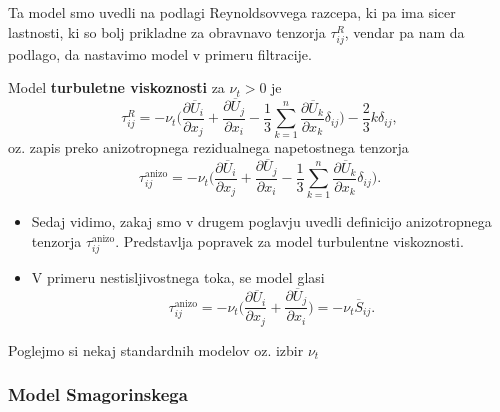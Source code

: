\documentclass[mat2, tisk]{fmfdelo}
\newcommand{\bd}{\textbf}
\begin{document}
Ta model smo uvedli na podlagi Reynoldsovvega razcepa, ki 
pa ima sicer lastnosti, ki so bolj prikladne za obravnavo 
tenzorja $\tau_{ij}^R$, vendar pa nam da podlago, da nastavimo 
model v primeru filtracije. 

\begin{definicija}
Model \bd{turbuletne viskoznosti} za $\nu_t > 0$ je 
\begin{equation}
\tau_{ij}^R = -\nu_t \Big(\frac{\partial \overline{U}_i}{\partial x_j} + \frac{\partial \overline{U}_j}{\partial x_i}
- \frac{1}{3} \sum_{k=1}^n \frac{\partial \overline{U}_k}{\partial x_k}\delta_{ij}\Big) - \frac{2}{3}k\delta_{ij},
\end{equation}
oz. zapis preko anizotropnega rezidualnega napetostnega tenzorja
\begin{equation}
\tau_{ij}^{\text{anizo}} = -\nu_t \Big(\frac{\partial \overline{U}_i}{\partial x_j} + \frac{\partial \overline{U}_j}{\partial x_i}
- \frac{1}{3} \sum_{k=1}^n \frac{\partial \overline{U}_k}{\partial x_k}\delta_{ij}\Big).
\end{equation}
\end{definicija}

\begin{opomba}
  \hfill 
\begin{itemize}
  \item Sedaj vidimo, zakaj smo v drugem poglavju uvedli definicijo 
  anizotropnega tenzorja $\tau_{ij}^{\text{anizo}}$. Predstavlja popravek
  za model turbulentne viskoznosti.
  \item V primeru nestisljivostnega toka, se model glasi 
  $$
  \tau_{ij}^{\text{anizo}} = -\nu_t \Big(\frac{\partial \overline{U}_i}{\partial x_j} + \frac{\partial \overline{U}_j}{\partial x_i}\Big) = -\nu_t \overline{S}_{ij}.
  $$
\end{itemize}
\end{opomba}

Poglejmo si nekaj standardnih modelov oz. izbir $\nu_t$
\subsubsection{Model Smagorinskega} 
\end{document}
